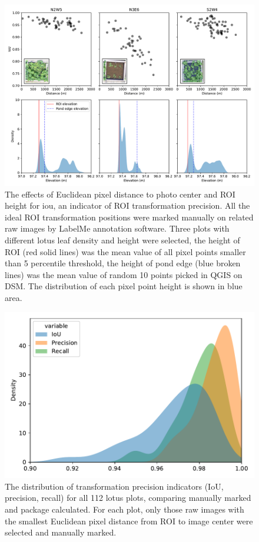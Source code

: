 \documentclass{configs/bmcart}
\begin{document}
\begin{backmatter}
\begin{figure}[!htb]
  \includegraphics[width=0.95\linewidth]{figures/dist.pdf}
  \caption{The effects of Euclidean pixel distance to photo center and ROI height for \acrfull*{iou}, an indicator of ROI transformation precision. All the ideal ROI transformation positions were marked manually on related raw images by LabelMe annotation software. Three plots with different lotus leaf density and height were selected, the height of ROI (red solid lines) was the mean value of all pixel points smaller than 5 percentile threshold, the height of pond edge (blue broken lines) was the mean value of random 10 points picked in QGIS on DSM. The distribution of each pixel point height is shown in blue area.}
  \label{fig:dist}
\end{figure}

\begin{figure}[!htb]
  \includegraphics[width=0.95\linewidth]{figures/iou_all.pdf}
  \caption{The distribution of transformation precision indicators (IoU, precision, recall) for all 112 lotus plots, comparing manually marked and package calculated. For each plot, only those raw images with the smallest Euclidean pixel distance from ROI to image center were selected and manually marked.}
  \label{fig:iou_all}
\end{figure}

\end{backmatter}
\end{document}
